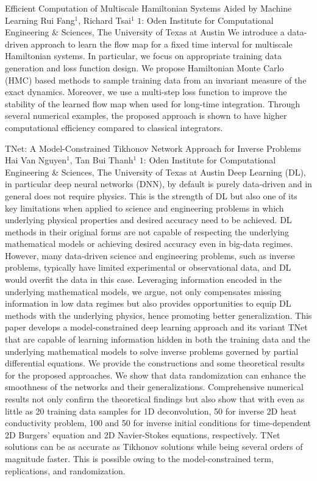 \begin{addmargin}[2em]{0em}
\vspace{1.5ex}
\abs
{Efficient Computation of Multiscale Hamiltonian Systems Aided by Machine Learning}
{Rui Fang$^1$, Richard Tsai$^1$}
{$1$: Oden Institute for Computational Engineering $\&$ Sciences, The University of Texas at Austin}
{We introduce a data-driven approach to learn the flow map for a fixed time interval for multiscale Hamiltonian systems. In particular, we focus on appropriate training data generation and loss function design. We propose Hamiltonian Monte Carlo (HMC) based methods to sample training data from an invariant measure of the exact dynamics. Moreover, we use a multi-step loss function to improve the stability of the learned flow map when used for long-time integration. Through several numerical examples, the proposed approach is shown to have higher computational efficiency compared to classical integrators.}


\vspace{1.5ex}
\abs
{TNet: A Model-Constrained Tikhonov Network Approach for Inverse Problems}
{Hai Van Nguyen$^1$, Tan Bui Thanh$^1$}
{$1$: Oden Institute for Computational Engineering \& Sciences, The University of Texas at Austin}
{Deep Learning (DL), in particular deep neural networks (DNN), by default is purely data-driven and in general does not require physics. This is the strength of DL but also one of its key limitations when applied to science and engineering problems in which underlying physical properties and desired accuracy need to be achieved. DL methods in their original forms are not capable of respecting the underlying mathematical models or achieving desired accuracy even in big-data regimes. However, many data-driven science and engineering problems, such as inverse problems, typically have limited experimental or observational data, and DL would overfit the data in this case. Leveraging information encoded in the underlying mathematical models, we argue, not only compensates missing information in low data regimes but also provides opportunities to equip DL methods with the underlying physics, hence promoting better generalization. This paper develops a model-constrained deep learning approach and its variant TNet that are capable of learning information hidden in both the training data and the underlying mathematical models to solve inverse problems governed by partial differential equations. We provide the constructions and some theoretical results for the proposed approaches. We show that data randomization can enhance the smoothness of the networks and their generalizations. Comprehensive numerical results not only confirm the theoretical findings but also show that with even as little as 20 training data samples for 1D deconvolution, 50 for inverse 2D heat conductivity problem, 100 and 50 for inverse initial conditions for time-dependent 2D Burgers' equation and 2D Navier-Stokes equations, respectively. TNet solutions can be as accurate as Tikhonov solutions while being several orders of magnitude faster. This is possible owing to the model-constrained term, replications, and randomization.}



\end{addmargin}
